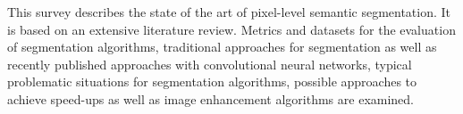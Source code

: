 This survey describes the state of the art of pixel-level semantic
segmentation. It is based on an extensive literature review. Metrics and
datasets for the evaluation of segmentation algorithms, traditional approaches
for segmentation as well as recently published approaches with convolutional
neural networks, typical problematic situations for segmentation algorithms,
possible approaches to achieve speed-ups as well as image enhancement
algorithms are examined.
